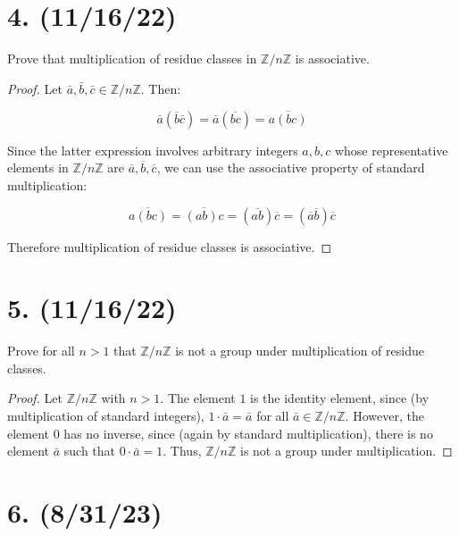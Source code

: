 \documentclass{article}
\begin{document}
\section*{4. (11/16/22)}

Prove that multiplication of residue classes in $\mathbb{Z}/n\mathbb{Z}$ is associative.

\begin{proof}
      Let $\bar{a}, \bar{b}, \bar{c} \in \mathbb{Z}/n\mathbb{Z}$. Then:

      \begin{equation*}
            \overline{a}(\overline{b}\overline{c}) = \overline{a}(\overline{bc}) = \overline{a(bc)}
      \end{equation*}

      Since the latter expression involves arbitrary integers $a, b, c$ whose representative elements in $\mathbb{Z}/n\mathbb{Z}$ are $\overline{a}, \overline{b}, \overline{c}$, we can use the associative property of standard multiplication:

      \begin{equation*}
            \overline{a(bc)} = \overline{(ab)c} = (\overline{ab})\overline{c} = (\overline{a}\overline{b})\overline{c} 
      \end{equation*}

      Therefore multiplication of residue classes is associative.
\end{proof}

\section*{5. (11/16/22)}

Prove for all $n > 1$ that $\mathbb{Z}/n\mathbb{Z}$ is not a group under multiplication of residue classes.

\begin{proof}
      Let $\mathbb{Z}/n\mathbb{Z}$ with $n > 1$. The element $1$ is the identity element, since (by multiplication of standard integers), $1 \cdot \bar{a} = \bar{a}$ for all $\bar{a} \in \mathbb{Z}/n\mathbb{Z}$. However, the element $0$ has no inverse, since (again by standard multiplication), there is no element $\bar{a}$ such that $0 \cdot \bar{a} = 1$. Thus, $\mathbb{Z}/n\mathbb{Z}$ is not a group under multiplication.
\end{proof}

\section*{6. (8/31/23)}
\end{document}
